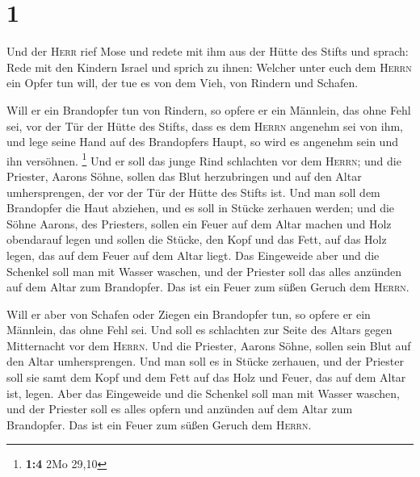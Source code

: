 \hypertarget{section}{%
\section{1}\label{section}}

 Und der \textsc{Herr} rief Mose und redete mit ihm aus
der Hütte des Stifts und sprach:  Rede mit den Kindern
Israel und sprich zu ihnen: Welcher unter euch dem \textsc{Herrn} ein
Opfer tun will, der tue es von dem Vieh, von Rindern und Schafen.

 Will er ein Brandopfer tun von Rindern, so opfere er ein
Männlein, das ohne Fehl sei, vor der Tür der Hütte des Stifts, dass es
dem \textsc{Herrn} angenehm sei von ihm,  und lege seine
Hand auf des Brandopfers Haupt, so wird es angenehm sein und ihn
versöhnen. \footnote{\textbf{1:4} 2Mo 29,10}  Und er soll
das junge Rind schlachten vor dem \textsc{Herrn}; und die Priester,
Aarons Söhne, sollen das Blut herzubringen und auf den Altar
umhersprengen, der vor der Tür der Hütte des Stifts ist. 
Und man soll dem Brandopfer die Haut abziehen, und es soll in Stücke
zerhauen werden;  und die Söhne Aarons, des Priesters,
sollen ein Feuer auf dem Altar machen und Holz obendarauf legen
 und sollen die Stücke, den Kopf und das Fett, auf das
Holz legen, das auf dem Feuer auf dem Altar liegt.  Das
Eingeweide aber und die Schenkel soll man mit Wasser waschen, und der
Priester soll das alles anzünden auf dem Altar zum Brandopfer. Das ist
ein Feuer zum süßen Geruch dem \textsc{Herrn}.

 Will er aber von Schafen oder Ziegen ein Brandopfer tun,
so opfere er ein Männlein, das ohne Fehl sei.  Und soll
es schlachten zur Seite des Altars gegen Mitternacht vor dem
\textsc{Herrn}. Und die Priester, Aarons Söhne, sollen sein Blut auf den
Altar umhersprengen.  Und man soll es in Stücke zerhauen,
und der Priester soll sie samt dem Kopf und dem Fett auf das Holz und
Feuer, das auf dem Altar ist, legen.  Aber das Eingeweide
und die Schenkel soll man mit Wasser waschen, und der Priester soll es
alles opfern und anzünden auf dem Altar zum Brandopfer. Das ist ein
Feuer zum süßen Geruch dem \textsc{Herrn}.

